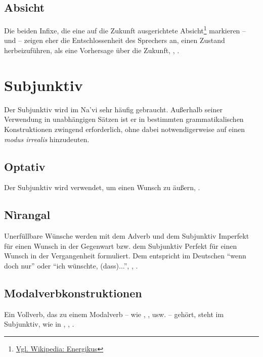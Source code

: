 \subsection{Absicht} Die beiden Infixe, die eine auf die Zukunft ausgerichtete Absicht\footnote{\href{https://de.wikipedia.org/wiki/Energikus}{Vgl. Wikipedia: Energikus}} markieren --  und  -- zeigen eher die Entschlossenheit des Sprechers an, einen Zustand herbeizuführen, als eine Vorhersage über die Zukunft,  ,  .\label{syn:verb:intenfut}

\section{Subjunktiv}
\noindent Der Subjunktiv wird im Na'vi sehr häufig gebraucht. Außerhalb seiner Verwendung in unabhängigen Sätzen ist er in bestimmten grammatikalischen Konstruktionen zwingend erforderlich, ohne dabei notwendigerweise auf einen \textit{modus irrealis} hinzudeuten.

\subsection{Optativ} Der Subjunktiv wird verwendet, um einen Wunsch zu äußern,  . 

\subsection{Nìrangal} Unerfüllbare Wünsche werden mit dem Adverb  und dem Subjunktiv Imperfekt für einen Wunsch in der Gegenwart bzw. dem Subjunktiv Perfekt für einen Wunsch in der Vergangenheit formuliert. Dem entspricht im Deutschen ``wenn doch nur'' oder ``ich wünschte, (dass)...'',  ,  .

\subsection{Modalverbkonstruktionen} 
Ein Vollverb, das zu einem Modalverb -- wie  ,  , usw. -- gehört, steht im Subjunktiv, wie in  ,  ,  . \label{syn:modals}

